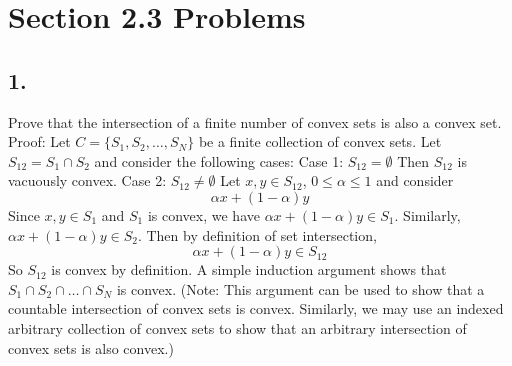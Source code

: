 \documentclass{article}
\begin{document}
\section*{Section 2.3 Problems}
\subsection*{1.} Prove that the intersection of a finite number of convex sets is also a convex set.
\newline\newline
Proof: Let $C = \{S_1, S_2, \dots, S_N\}$ be a finite collection of convex sets. Let $S_{12} = S_1 \cap S_2$ and consider the following cases:
\newline\newline
Case 1: $S_{12} = \emptyset$
\newline
Then $S_{12}$ is vacuously convex. 
\newline\newline
Case 2: $S_{12} \neq \emptyset$
\newline
Let $x, y \in S_{12}$, $0\leq \alpha \leq 1$ and consider 
\[\alpha x + (1 - \alpha)y\]
Since $x,y \in S_1$ and $S_1$ is convex, we have $\alpha x + (1 - \alpha)y \in S_1$. Similarly, $\alpha x + (1 - \alpha)y \in S_2$. Then by definition of set intersection,
\[\alpha x + (1 - \alpha)y \in S_{12}\]
So $S_{12}$ is convex by definition. 
\newline\newline
A simple induction argument shows that $S_1 \cap S_2 \cap \dots \cap S_N$ is convex. 
\newline\newline
(Note: This argument can be used to show that a countable intersection of convex sets is convex. Similarly, we may use an indexed arbitrary collection of convex sets to show that an arbitrary intersection of convex sets is also convex.)
\end{document}
